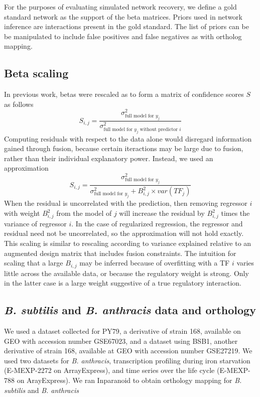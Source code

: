 \documentclass[11pt]{article}
\begin{document}
For the purposes of evaluating simulated network recovery, we define a gold standard network as the support of the beta matrices. Priors used in network inference are interactions present in the gold standard. The list of priors can be be manipulated to include false positives and false negatives as with ortholog mapping. 

\subsection{Beta scaling}
In previous work, betas were rescaled as to form a matrix of confidence scores $S$ as follows
\begin{equation}
S_{i,j} = \frac{\sigma^2_{\text{full model for }y_j}}{\sigma^2_{\text{full model for }y_j \text{ without predictor }i}}
\end{equation}
Computing residuals with respect to the data alone would disregard information gained through fusion, because certain iteractions may be large due to fusion, rather than their individual explanatory power. Instead, we used an approximation
\begin{equation}
S_{i,j} = \frac{\sigma^2_{\text{full model for }y_j}}{\sigma^2_{\text{full model for }y_j} + B_{i,j}^2 \times var(TF_j)}
\end{equation}
When the residual is uncorrelated with the prediction, then removing regressor $i$ with weight $B_{i,j}^2$ from the model of $j$ will increase the residual by $B_{i,j}^2$ times the variance of regressor $i$. In the case of regularized regression, the regressor and residual need not be uncorrelated, so the approximation will not hold exactly. This scaling is similar to rescaling according to variance explained relative to an augmented design matrix that includes fusion constraints. The intuition for scaling that a large $B_{i,j}$ may be inferred because of overfitting with a TF $i$ varies little across the available data, or because the regulatory weight is strong. Only in the latter case is a large weight suggestive of a true regulatory interaction.

\subsection{\textit{B. subtilis} and \textit{B. anthracis} data and orthology}
We used a dataset collected for PY79, a derivative of strain 168, available on GEO with accession number GSE67023, and a dataset using BSB1, another derivative of strain 168, available at GEO with accession number GSE27219. We used two datasets for \textit{B. anthracis}, transcription profiling during iron starvation (E-MEXP-2272 on ArrayExpress), and time series over the life cycle (E-MEXP-788 on ArayExpress). We ran Inparanoid to obtain orthology mapping for \textit{B. subtilis} and \textit{B. anthracis} \cite{ostlund_inparanoid_2010}
\end{document}
